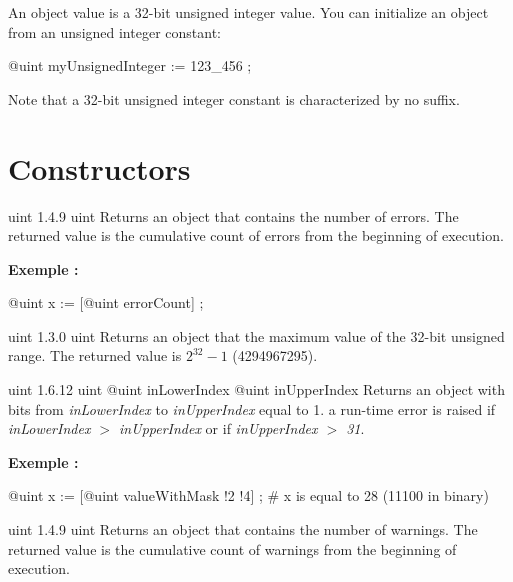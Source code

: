 

An  object value is a 32-bit unsigned integer value. You can initialize an  object from an unsigned integer constant:\\

\begin{galgascode}
@uint myUnsignedInteger := 123_456 ;
\end{galgascode}

Note that a 32-bit unsigned integer constant is characterized by no suffix.

\section{Constructors}

{uint}
{1.4.9}
{uint}
{Returns an  object that contains the number of errors.}
{The returned value is the cumulative count of errors from the beginning of execution.}

\textbf{Exemple :}
\begin{galgascode}
@uint x := [@uint errorCount] ;
\end{galgascode}

{uint}
{1.3.0}
{uint}
{Returns an  object that the maximum value of the 32-bit unsigned range.}
{The returned value is $2^{32}-1$ (4294967295).}


{uint}
{1.6.12}
{uint}
{@uint inLowerIndex}
{@uint inUpperIndex}
{Returns an  object with bits from \emph{inLowerIndex} to \emph{inUpperIndex} equal to 1.}
{a run-time error is raised if \emph{inLowerIndex $>$ inUpperIndex} or if \emph{inUpperIndex $>$ 31}.}



\textbf{Exemple :}
\begin{galgascode}
@uint x := [@uint valueWithMask !2 !4] ; # x is equal to 28 (11100 in binary)
\end{galgascode}




{uint}
{1.4.9}
{uint}
{Returns an  object that contains the number of warnings.}
{The returned value is the cumulative count of warnings from the beginning of execution.}

